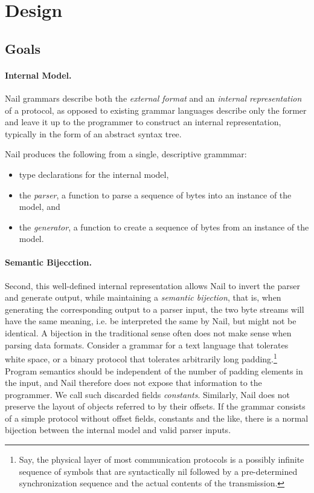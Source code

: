 \section{Design}
\label{s:design}

\subsection{Goals}
\paragraph{Internal Model.}
Nail grammars describe both the \emph{external format} and an \emph{internal representation} of a
protocol, as opposed to existing grammar languages describe only the former and leave it up to the programmer to
construct an internal representation, typically in the form of an abstract syntax tree. 

Nail produces the following from a single, descriptive grammmar: 
\begin{itemize}
\item type declarations for the internal model,
\item the \textit{parser}, a function to parse a sequence of bytes into an
instance of the model, and
\item the \textit{generator}, a function to create a
sequence of bytes from an instance of the model.
\end{itemize}

\noindent

\paragraph{Semantic Bijecction.}
Second, this well-defined internal representation allows Nail to invert the
parser and generate output, while maintaining a \emph{semantic bijection}, that is, when generating
the corresponding output to a parser input, the two byte streams will have the same meaning, i.e. be
interpreted the same by Nail, but might not be identical.
A bijection in the traditional sense often does not make sense when parsing data formats. 
Consider a grammar for a text language that tolerates white space, or a binary protocol that tolerates
arbitrarily long padding.\footnote{Say, the physical layer of most communication
  protocols is a possibly infinite sequence of symbols that are syntactically
  nil followed by a pre-determined synchronization sequence and the actual
  contents of the transmission.} Program semantics should be
independent of the number of padding elements in the input, and Nail therefore
does not expose that information to the programmer. We call such discarded
fields \emph{constants}. 
Similarly, Nail does not preserve the layout of
objects referred to by their offsets. If the grammar consists of a simple protocol without offset
fields, constants and the like, there is a normal bijection between the internal model and valid
parser inputs.
